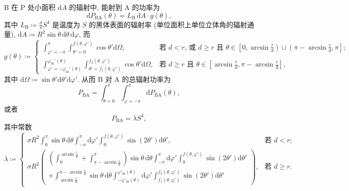 \documentclass{article}
\begin{document}
B 在 $\mathrm P$ 处小面积 $\mathrm dA$ 的辐射中, 能射到 A 的功率为
\begin{equation}
	\mathrm dP_\mathrm{BA}\!\left(\theta\right)=
	L_\mathrm B\,\mathrm dA\cdot g\!\left(\theta\right),
\end{equation}
其中 $L_\mathrm B\coloneqq \frac\sigma\pi S^4$ 是温度为 $S$ 的黑体表面的辐射率 (单位面积上单位立体角的辐射通量),
$\mathrm dA\coloneqq R^2\sin\theta\,\mathrm d\theta\,\mathrm d\varphi$,
而
\begin{equation}
	g\!\left(\theta\right)\coloneqq \begin{cases}
		\int_{\varphi'=-\pi}^{\pi}
		\int_{\theta'=0}^{f\!\left(\theta,\varphi'\right)}
		\cos\theta'\mathrm d\Omega,
		&\text{若 $d<r$, 或 $d\ge r$ 且
		$\theta\in\left[0,\arcsin\frac rd\right)\cup\left(\pi-\arcsin\frac rd,\pi\right]$;}\\
		\int_{\varphi'=-\varphi_\mathrm m'\!\left(\theta\right)}^{\varphi_\mathrm m'\!\left(\theta\right)}
		\int_{\theta'=f_1\!\left(\theta,\varphi'\right)}^{f_2\!\left(\theta,\varphi'\right)}
		\cos\theta'\mathrm d\Omega,
		&\text{若 $d\ge r$ 且 $\theta\in\left[\arcsin\frac rd,\pi-\arcsin\frac rd\right]$,}
	\end{cases}
\end{equation}
其中 $\mathrm d\Omega\coloneqq \sin\theta'\mathrm d\theta'\mathrm d\varphi'$.
从而 B 对 A 的总辐射功率为
\begin{equation}
	P_\mathrm{BA}=\int_{\theta=0}^\pi\int_{\varphi=-\pi}^{\pi}\mathrm dP_\mathrm{BA}\!\left(\theta\right),
\end{equation}
或者
\begin{equation}
	P_\mathrm{BA}=\lambda S^4,
\end{equation}
其中常数
\begin{equation}
	\lambda\coloneqq \begin{cases}
		\sigma R^2\int_0^\pi\sin\theta\,\mathrm d\theta
		\int_{-\pi}^\pi\mathrm d\varphi'
		\int_0^{f\!\left(\theta,\varphi'\right)}\sin\!\left(2\theta'\right)\mathrm d\theta',
		&\text{若 $d<r$;}\\
		\sigma R^2\left(
		\begin{matrix}\left(\int_0^{\arcsin\frac rd}+\int_{\pi-\arcsin\frac rd}^\pi\right)\sin\theta\,\mathrm d\theta
		\int_{-\pi}^\pi\mathrm d\varphi'
		\int_0^{f\!\left(\theta,\varphi'\right)}\sin\!\left(2\theta'\right)\mathrm d\theta'
		\\+\int_{\arcsin\frac rd}^{\pi-\arcsin\frac rd}\sin\theta\,\mathrm d\theta
		\int_{-\varphi'_\mathrm m\!\left(\theta\right)}^{\varphi'_\mathrm m\!\left(\theta\right)}\mathrm d\varphi'
		\int_{f_1\!\left(\theta,\varphi'\right)}^{f_2\!\left(\theta,\varphi'\right)}
		\sin\!\left(2\theta'\right)\mathrm d\theta'
		\end{matrix}\right),
		&\text{若 $d\ge r$.}
	\end{cases}
	\label{eq:黑体辐射参数}
\end{equation}
\end{document}
